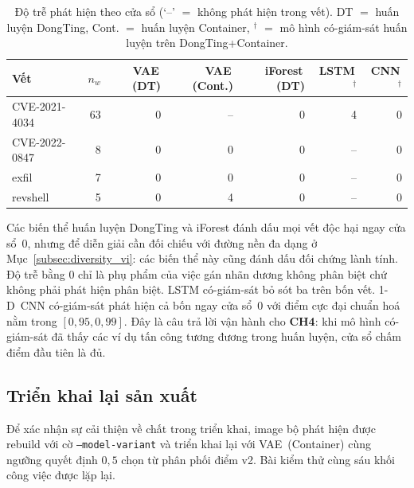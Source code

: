 \begin{table}[!t]
\centering
\caption{Độ trễ phát hiện theo cửa sổ (`--' $=$ không phát hiện trong
vết). DT $=$ huấn luyện DongTing, Cont. $=$ huấn luyện Container,
$^{\dag}$ $=$ mô hình có-giám-sát huấn luyện trên DongTing+Container.}
\label{tab:cve_latency_vi}
\begin{tabular}{lrrrrrr}
\toprule
Vết            & $n_w$ & VAE\,(DT) & VAE\,(Cont.) & iForest\,(DT) & LSTM\,$^{\dag}$ & CNN\,$^{\dag}$ \\
\midrule
CVE-2021-4034  & 63    & 0         & --           & 0             & 4               & 0              \\
CVE-2022-0847  & 8     & 0         & 0            & 0             & --              & 0              \\
exfil          & 7     & 0         & 0            & 0             & --              & 0              \\
revshell       & 5     & 0         & 4            & 0             & --              & 0              \\
\bottomrule
\end{tabular}
\end{table}

Các biến thể huấn luyện DongTing và iForest đánh dấu mọi vết độc hại
ngay cửa sổ~$0$, nhưng để diễn giải cần đối chiếu với đường nền đa
dạng ở Mục~\ref{subsec:diversity_vi}: các biến thể này cũng đánh dấu
đối chứng lành tính. Độ trễ bằng 0 chỉ là phụ phẩm của việc gán nhãn
dương không phân biệt chứ không phải phát hiện phân biệt. LSTM
có-giám-sát bỏ sót ba trên bốn vết. 1-D~CNN có-giám-sát phát hiện cả
bốn ngay cửa sổ~$0$ với điểm cực đại chuẩn hoá nằm trong $[0{,}95,
0{,}99]$. Đây là câu trả lời vận hành cho \textbf{CH4}: khi mô hình
có-giám-sát đã thấy các ví dụ tấn công tương đương trong huấn luyện,
cửa sổ chấm điểm đầu tiên là đủ.

\subsection{Triển khai lại sản xuất}
\label{subsec:redeploy_vi}
Để xác nhận sự cải thiện về chất trong triển khai, image bộ phát hiện
được rebuild với cờ \texttt{--model-variant} và triển khai lại với
VAE~(Container) cùng ngưỡng quyết định $0{,}5$ chọn từ phân phối điểm
v2. Bài kiểm thử cùng sáu khối công việc được lặp lại.

